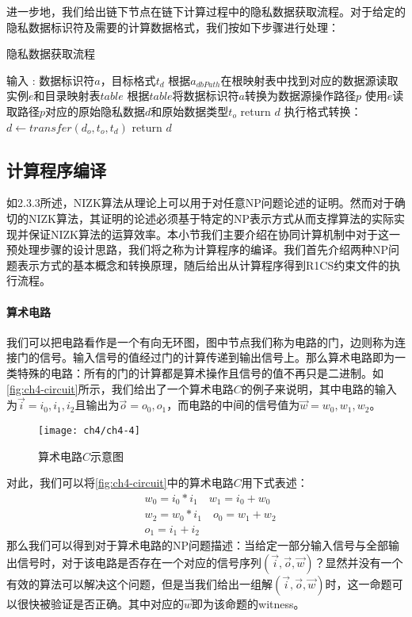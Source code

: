 进一步地，我们给出链下节点在链下计算过程中的隐私数据获取流程。对于给定的隐私数据标识符及需要的计算数据格式，我们按如下步骤进行处理：
\begin{breakablealgorithm}
    \caption{隐私数据获取流程}
    \label{alg:ch4-1}
    \begin{algorithmic} 
    \item [输入]: 数据标识符$a$，目标格式$t_d$
    \STATE 根据$a_{dbPath}$在根映射表中找到对应的数据源读取实例$e$和目录映射表$table$
    \STATE 根据$table$将数据标识符$a$转换为数据源操作路径$p$
    \STATE 使用$e$读取路径$p$对应的原始隐私数据$d$和原始数据类型$t_o$
    \STATE return $d$
    \ENDIF
    \STATE 执行格式转换：$d \leftarrow transfer(d_o, t_o, t_d)$
    \STATE return $d$
    \end{algorithmic}
\end{breakablealgorithm}

\subsection{计算程序编译} 
如2.3.3所述，NIZK算法从理论上可以用于对任意NP问题论述的证明。然而对于确切的NIZK算法，其证明的论述必须基于特定的NP表示方式从而支撑算法的实际实现并保证NIZK算法的运算效率。本小节我们主要介绍在协同计算机制中对于这一预处理步骤的设计思路，我们将之称为计算程序的编译。我们首先介绍两种NP问题表示方式的基本概念和转换原理，随后给出从计算程序得到R1CS约束文件的执行流程。

\paragraph{算术电路} 我们可以把电路看作是一个有向无环图，图中节点我们称为电路的门，边则称为连接门的信号。输入信号的值经过门的计算传递到输出信号上。那么算术电路即为一类特殊的电路：所有的门的计算都是算术操作且信号的值不再只是二进制。如\autoref{fig:ch4-circuit}所示，我们给出了一个算术电路$C$的例子来说明，其中电路的输入为$\vec{i} = i_0, i_1, i_2$且输出为$\vec{o} = o_0, o_1$，而电路的中间的信号值为$\vec{w} = w_0, w_1, w_2$。

\begin{figure}[htbp]
    \centering
    \texttt{[image: ch4/ch4-4]}
    \caption{\label{fig:ch4-circuit}算术电路$C$示意图}
\end{figure}

对此，我们可以将\autoref{fig:ch4-circuit}中的算术电路$C$用下式表述：
\begin{equation}
    \begin{split}
    &w_0 = i_0 * i_1 \quad w_1 = i_0 + w_0 \\
    &w_2 = w_0 * i_1 \quad o_0 = w_1 + w_2 \\
    &o_1 = i_1 + i_2
    \end{split}
\end{equation}
那么我们可以得到对于算术电路的NP问题描述：当给定一部分输入信号与全部输出信号时，对于该电路是否存在一个对应的信号序列$(\vec{i}, \vec{o}, \vec{w})$？显然并没有一个有效的算法可以解决这个问题，但是当我们给出一组解$(\vec{i}, \vec{o}, \vec{w})$时，这一命题可以很快被验证是否正确。其中对应的$\vec{w}$即为该命题的witness。

